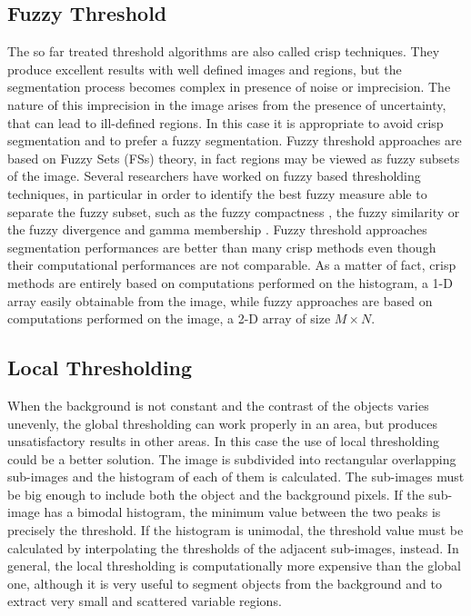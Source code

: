 \documentclass[final,a4paper,12pt,english]{UnicaPhdThesis3}
\begin{document}
	\subsection{Fuzzy Threshold} %
	The so far treated threshold algorithms are also called crisp techniques. They produce excellent results with well defined images and regions, but the segmentation process becomes complex in presence of noise or imprecision. The nature of this imprecision in the image arises from the presence of uncertainty, that can lead to ill-defined regions. In this case it is appropriate to avoid crisp segmentation and to prefer a fuzzy segmentation. Fuzzy threshold approaches are based on Fuzzy Sets (\acs{FS}s) theory, in fact regions may be viewed as fuzzy subsets of the image. Several researchers have worked on fuzzy based thresholding techniques, in particular in order to identify the best fuzzy measure able to separate the fuzzy subset, such as the fuzzy compactness \cite{Pal}, the fuzzy similarity \cite{Ramar} or the fuzzy divergence and gamma membership \cite{Cha03, MeloP}.
	Fuzzy threshold approaches segmentation performances are better than many crisp methods even though their computational performances are not comparable. As a matter of fact, crisp methods are entirely based on computations performed on the histogram, a 1-D array easily obtainable from the image, while fuzzy approaches are based on computations performed on the image, a 2-D array of size $M \times N$.
	
	\subsection{Local Thresholding} \label{LT} %
	When the background is not constant and the contrast of the objects varies unevenly, the global thresholding can work properly in an area, but produces unsatisfactory results in other areas. In this case the use of local thresholding could be a better solution. The image is subdivided into rectangular overlapping sub-images and the histogram of each of them is calculated. The sub-images must be big enough to include both the object and the background pixels. If the sub-image has a bimodal histogram, the minimum value between the two peaks is precisely the threshold. If the histogram is unimodal, the threshold value must be calculated by interpolating the thresholds of the adjacent sub-images, instead. In general, the local thresholding is computationally more expensive than the global one, although it is very useful to segment objects from the background and to extract very small and scattered variable regions.
	
\end{document}
